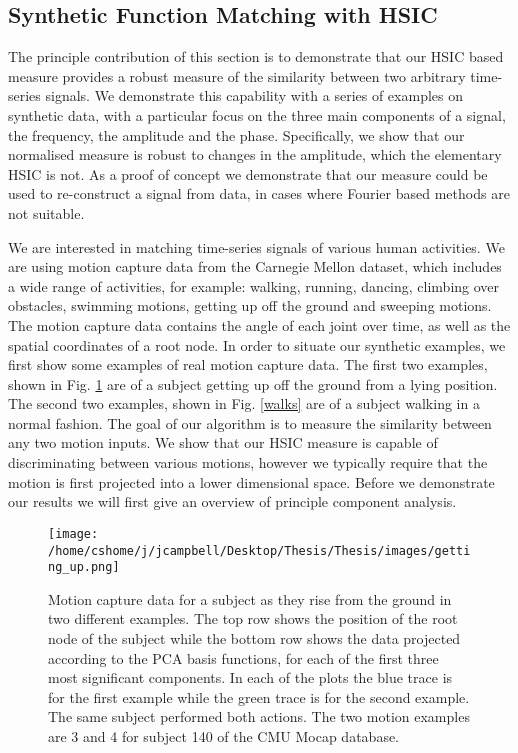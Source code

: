 \subsection{Synthetic Function Matching with HSIC}

The principle contribution of this section is to demonstrate that our HSIC based measure provides a robust measure of the similarity between two arbitrary time-series signals. We demonstrate this capability with a series of examples on synthetic data, with a particular focus on the three main components of a signal, the frequency, the amplitude and the phase. Specifically, we show that our normalised measure is robust to changes in the amplitude, which the elementary HSIC is not. As a proof of concept we demonstrate that our measure could be used to re-construct a signal from data, in cases where Fourier based methods are not suitable. 

We are interested in matching time-series signals of various human activities. We are using motion capture data from the Carnegie Mellon dataset, which includes a wide range of activities, for example: walking, running, dancing, climbing over obstacles, swimming motions, getting up off the ground and sweeping motions. The motion capture data contains the angle of each joint over time, as well as the spatial coordinates of a root node. In order to situate our synthetic examples, we first show some examples of real motion capture data. The first two examples, shown in Fig. \ref{getting_up} are of a subject getting up off the ground from a lying position. The second two examples, shown in Fig. \ref{walks} are of a subject walking in a normal fashion. The goal of our algorithm is to measure the similarity between any two motion inputs. We show that our HSIC measure is capable of discriminating between various motions, however we typically require that the motion is first projected into a lower dimensional space. Before we demonstrate our results we will first give an overview of principle component analysis.

\begin{figure}
\texttt{[image: /home/cshome/j/jcampbell/Desktop/Thesis/Thesis/images/getting\_up.png]}
\caption{Motion capture data for a subject as they rise from the ground in two different examples. The top row shows the position of the root node of the subject while the bottom row shows the data projected according to the PCA basis functions, for each of the first three most significant components. In each of the plots the blue trace is for the first example while the green trace is for the second example. The same subject performed both actions. The two motion examples are 3 and 4 for subject 140 of the CMU Mocap database. \label{getting_up}}
\end{figure}

